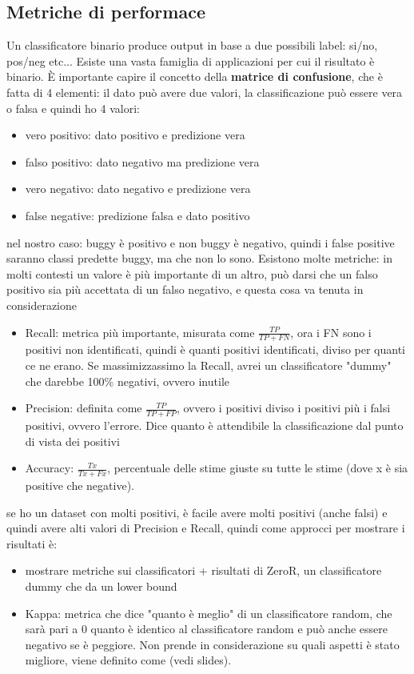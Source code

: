 \documentclass{article}
\begin{document}
\subsection{Metriche di performace}
Un classificatore binario produce output in base a due possibili label: si/no, pos/neg etc... Esiste una vasta famiglia di applicazioni per cui il risultato è binario. È importante capire il concetto della \textbf{matrice di confusione}, che è fatta di 4 elementi: il dato può avere due valori, la classificazione può essere vera o falsa e quindi ho 4 valori:
\begin{itemize}
\item vero positivo: dato positivo e predizione vera
\item falso positivo: dato negativo ma predizione vera
\item vero negativo: dato negativo e predizione vera
\item false negative: predizione falsa e dato positivo
\end{itemize}
nel nostro caso: buggy è positivo e non buggy è negativo, quindi i false positive saranno classi predette buggy, ma che non lo sono. Esistono molte metriche: in molti contesti un valore è più importante di un altro, può darsi che un falso positivo sia più accettata di un falso negativo, e questa cosa va tenuta in considerazione
\begin{itemize}
\item Recall: metrica più importante, misurata come $\frac{TP}{TP + FN}$, ora i FN sono i positivi non identificati, quindi è quanti positivi identificati, diviso per quanti ce ne erano.  Se massimizzassimo la Recall, avrei un classificatore "dummy" che darebbe 100\% negativi, ovvero inutile
\item Precision: definita come $\frac{TP}{TP + FP}$, ovvero i positivi diviso i positivi più i falsi positivi, ovvero l'errore. Dice quanto è  
attendibile la classificazione dal punto di vista dei positivi
\item Accuracy: $\frac{Tx}{Tx + Fx}$, percentuale delle stime giuste su tutte le stime (dove x è sia positive che negative).
\end{itemize}
se ho un dataset con molti positivi, è facile avere molti positivi (anche falsi) e quindi avere alti valori di Precision e Recall, quindi come approcci per mostrare i risultati è:
\begin{itemize}
\item mostrare metriche sui classificatori + risultati di ZeroR, un classificatore dummy che da un lower bound
\item Kappa: metrica che dice "quanto è meglio" di un classificatore random, che sarà pari a 0 quanto è identico al classificatore random e può anche essere negativo se è peggiore. Non prende in considerazione su quali aspetti è stato migliore, viene definito come (vedi slides).
\end{itemize}
\end{document}
